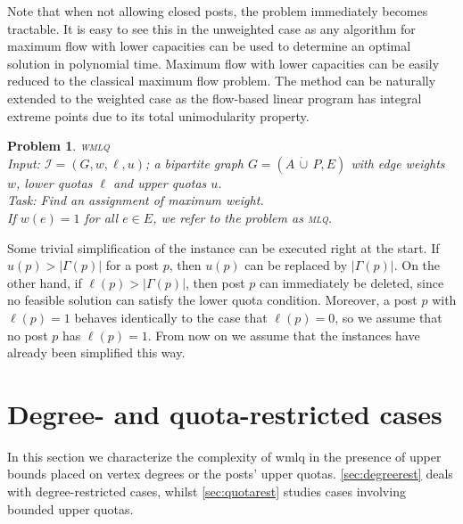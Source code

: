\documentclass{llncs}
\newtheorem{pr}[theorem]{Problem}
\begin{document}
\begin{remark}
Note that when not allowing closed posts, the problem immediately becomes tractable. It is easy to see this in the unweighted case as any algorithm for maximum flow with lower capacities can be used to determine an optimal solution in polynomial time. Maximum flow with lower capacities can be easily reduced to the classical maximum flow problem. The method can be naturally extended to the weighted case as the flow-based linear program has integral extreme points due to its total unimodularity property.
\end{remark}

\begin{pr}\textsc{wmlq}\ \\
	Input: $\mathcal{I} = (G, w, \ell, u)$; a bipartite graph $G = (A\,\dot\cup\,P, E)$ with edge weights $w$, lower quotas $\ell$ and upper quotas $u$.\\
Task: Find an assignment of maximum weight.\\
If $w(e)=1$ for all $e \in E$, we refer to the problem as \textsc{mlq}.
\label{pr:wmlq}
\end{pr}
 


Some trivial simplification of the instance can be executed right at the start. If $u(p) > |\Gamma(p)|$ for a post $p$, then $u(p)$ can be replaced by $|\Gamma(p)|$. On the other hand, if $\ell(p) > |\Gamma(p)|$, then post $p$ can immediately be deleted, since no feasible solution can satisfy the lower quota condition. Moreover, a post $p$ with $\ell(p) = 1$ behaves identically to the case that $\ell(p) = 0$, so we assume that no post $p$ has $\ell(p) = 1$. From now on we assume that the instances have already been simplified this way.

\section{Degree- and quota-restricted cases}\label{sec:com_rest}
In this section we characterize the complexity of {\sc wmlq} in the presence of upper bounds placed on vertex degrees or the posts' upper quotas.  \cref{sec:degreerest} deals with degree-restricted cases, whilst \cref{sec:quotarest} studies cases involving bounded upper quotas.
\end{document}
